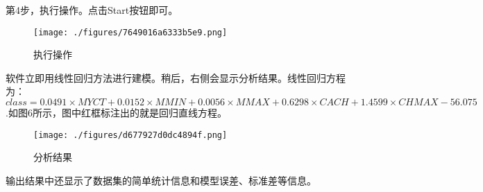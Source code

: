 第4步，执行操作。点击Start按钮即可。
\begin{figure}[ht]
\centering
\texttt{[image: ./figures/7649016a6333b5e9.png]}
\caption{执行操作} \label{fig_LiGr_4}
\end{figure}

软件立即用线性回归方法进行建模。稍后，右侧会显示分析结果。线性回归方程为：$class=0.0491 \times MYCT+0.0152 \times MMIN+0.0056 \times MMAX+0.6298 \times CACH+1.4599 \times CHMAX-56.075$.如图6所示，图中红框标注出的就是回归直线方程。
\begin{figure}[ht]
\centering
\texttt{[image: ./figures/d677927d0dc4894f.png]}
\caption{分析结果} \label{fig_LiGr_6}
\end{figure}
输出结果中还显示了数据集的简单统计信息和模型误差、标准差等信息。